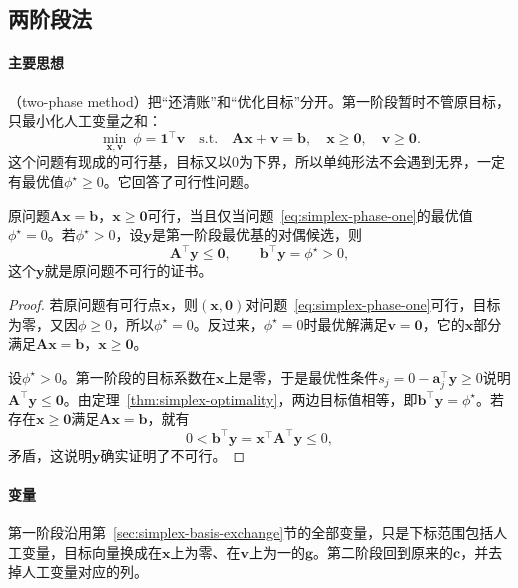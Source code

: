 \subsection{两阶段法}
\label{sec:simplex-two-phase}

\paragraph{主要思想}
（two-phase method）把“还清账”和“优化目标”分开。第一阶段暂时不管原目标，只最小化人工变量之和：
\begin{equation}
 \min_{\bm{x},\bm{v}}\ \phi=\bm{1}^\top\bm{v}
 \quad\text{s.t.}\quad
 \bm{A}\bm{x}+\bm{v}=\bm{b},\quad\bm{x}\geq\bm{0},\quad\bm{v}\geq\bm{0}.
 \label{eq:simplex-phase-one}
\end{equation}
这个问题有现成的可行基，目标又以$0$为下界，所以单纯形法不会遇到无界，一定有最优值$\phi^\star\geq0$。它回答了可行性问题。

\begin{theorem}[第一阶段的结论]
 \label{thm:simplex-phase-one}
 原问题$\bm{A}\bm{x}=\bm{b}$，$\bm{x}\geq\bm{0}$可行，当且仅当问题~\eqref{eq:simplex-phase-one}的最优值$\phi^\star=0$。若$\phi^\star>0$，设$\bm{y}$是第一阶段最优基的对偶候选，则
 \begin{equation}
  \bm{A}^\top\bm{y}\leq\bm{0},\qquad \bm{b}^\top\bm{y}=\phi^\star>0,
  \label{eq:simplex-farkas-certificate}
 \end{equation}
 这个$\bm{y}$就是原问题不可行的证书。
\end{theorem}

\begin{proof}
 若原问题有可行点$\bm{x}$，则$(\bm{x},\bm{0})$对问题~\eqref{eq:simplex-phase-one}可行，目标为零，又因$\phi\geq0$，所以$\phi^\star=0$。反过来，$\phi^\star=0$时最优解满足$\bm{v}=\bm{0}$，它的$\bm{x}$部分满足$\bm{A}\bm{x}=\bm{b}$，$\bm{x}\geq\bm{0}$。

 设$\phi^\star>0$。第一阶段的目标系数在$\bm{x}$上是零，于是最优性条件$s_j=0-\bm{a}_j^\top\bm{y}\geq0$说明$\bm{A}^\top\bm{y}\leq\bm{0}$。由定理~\ref{thm:simplex-optimality}，两边目标值相等，即$\bm{b}^\top\bm{y}=\phi^\star$。若存在$\bm{x}\geq\bm{0}$满足$\bm{A}\bm{x}=\bm{b}$，就有
 \[
  0<\bm{b}^\top\bm{y}=\bm{x}^\top\bm{A}^\top\bm{y}\leq0,
 \]
 矛盾，这说明$\bm{y}$确实证明了不可行。
\end{proof}

\paragraph{变量}
第一阶段沿用第~\ref{sec:simplex-basis-exchange}节的全部变量，只是下标范围包括人工变量，目标向量换成在$\bm{x}$上为零、在$\bm{v}$上为一的$\bm{g}$。第二阶段回到原来的$\bm{c}$，并去掉人工变量对应的列。

